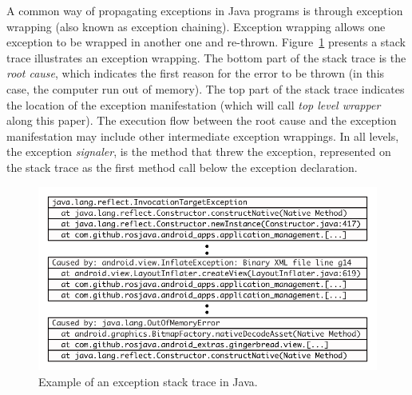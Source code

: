 \documentclass[conference]{IEEEtran}
\begin{document}
 A common way of  propagating exceptions in Java programs is through exception wrapping
 (also known as exception chaining). Exception wrapping allows one exception 
to be wrapped in another one and re-thrown. Figure~\ref{fig:wrapping} presents 
a stack trace  illustrates an exception wrapping. The bottom 
part of the stack trace is the \emph{root cause}, which indicates the
first reason for the error to be thrown (in this case, the computer run out of
memory). The top part of the stack trace indicates the location of the exception
manifestation (which will call \emph{top level wrapper} along this paper). The
execution flow  between the root cause and the exception manifestation may
include other intermediate exception wrappings. In all levels, the exception
\emph{signaler}, is the method that threw the exception, represented on the
stack trace as the first method call below the exception declaration.

\begin{figure} \centering \includegraphics[scale=0.6]{stacktrace_bw.png}
\caption{Example of an exception stack trace in Java.}
\label{fig:wrapping}
\end{figure}


\end{document}
